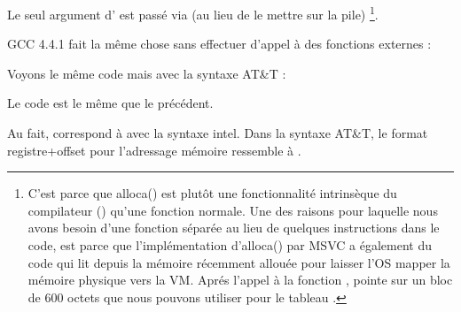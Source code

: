 Le seul argument d' est passé via \EAX (au lieu de le mettre sur la pile)
\footnote{C'est parce que alloca() est plutôt une fonctionnalité intrinsèque du compilateur () qu'une fonction normale. Une des raisons pour laquelle nous avons besoin d'une fonction séparée au lieu de quelques instructions dans le code, est parce que l'implémentation d'alloca() par \ac{MSVC} a également du code qui lit depuis la mémoire récemment allouée pour laisser l'\ac{OS} mapper la mémoire physique vers la \ac{VM}. Aprés l'appel à la fonction , \ESP pointe sur un bloc de 600 octets que nous pouvons utiliser pour le tableau .}.


GCC 4.4.1 fait la même chose sans effectuer d'appel à des fonctions externes :




Voyons le même code mais avec la syntaxe AT\&T :



\myindex{\ATTSyntax}
Le code est le même que le précédent.

Au fait,  correspond à
 avec la syntaxe intel.
Dans la syntaxe AT\&T, le format registre+offset pour l'adressage mémoire
ressemble à .
